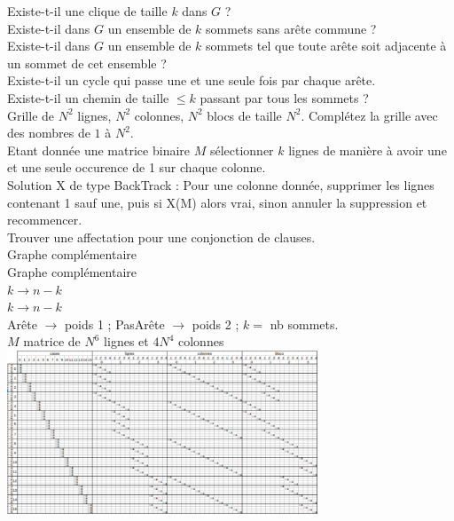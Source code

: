  Existe-t-il une clique de taille $k$ dans $G$ ?\\

 Existe-t-il dans $G$ un ensemble de $k$ sommets sans arête commune ?\\

 Existe-t-il dans $G$ un ensemble de $k$ sommets tel que toute arête soit adjacente à un sommet de cet ensemble ? \\

 Existe-t-il un cycle qui passe une et une seule fois par chaque arête. \\

 Existe-t-il un chemin de taille $\leq k$ passant par tous les sommets ? \\

 Grille de $N^2$ lignes, $N^2$ colonnes, $N^2$ blocs de taille $N^2$. Complétez la grille avec des nombres de $1$ à $N^2$. \\

 Etant donnée une matrice binaire $M$ sélectionner $k$ lignes de manière à avoir une et une seule occurence de 1 sur chaque colonne. \\
Solution X de type BackTrack : Pour une colonne donnée, supprimer les lignes contenant 1 sauf une, puis si X(M) alors vrai, sinon annuler la suppression et recommencer. \\

 Trouver une affectation pour une conjonction de clauses. \\
 
 Graphe complémentaire \\

 Graphe complémentaire \\

 $k \rightarrow n-k$ \\

 $k \rightarrow n-k$ \\

 Arête $\rightarrow$ poids 1 ; PasArête $\rightarrow$ poids 2 ; $k = $ nb sommets. \\

 $M$ matrice de $N^6$ lignes et $4N^4$ colonnes \\
\includegraphics[width=350px]{Images/04_sudoku_couv.pdf}




